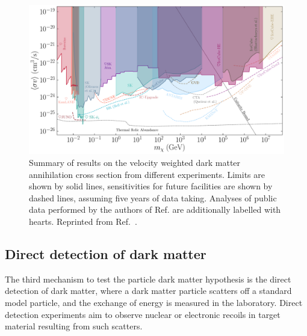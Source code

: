 \begin{figure}
    \centering
    \includegraphics[width=\linewidth]{figures/DMOverview/MainPlot.pdf}
    \caption[Summary of results on the velocity weighted dark matter annihilation cross section from different indirect detection experiments.]{Summary of results on the velocity weighted dark matter annihilation cross section from different experiments. Limits are shown by solid lines, sensitivities for future facilities are shown by dashed lines, assuming five years of data taking. Analyses of public data performed by the authors of Ref.\cite{Arguelles:2019ouk} are additionally labelled with hearts. Reprinted from Ref.~\cite{Arguelles:2019ouk}.}
    \label{fig:DMOverview/DMAnnhillationCrossSection}
\end{figure}

\subsection{Direct detection of dark matter}\label{sec:DMOverview/DirectDetection}
The third mechanism to test the particle dark matter hypothesis is the direct detection of dark matter, where a dark matter particle scatters off a standard model particle, and the exchange of energy is measured in the laboratory. Direct detection experiments aim to observe nuclear or electronic recoils in target material resulting from such scatters.

